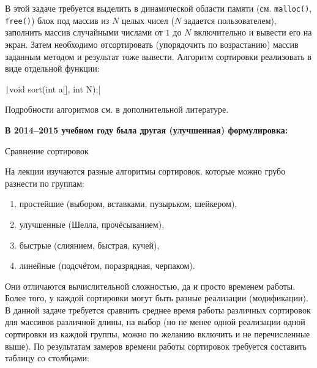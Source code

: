
В этой задаче требуется выделить в динамической области памяти 
(см. \texttt{malloc()}, \texttt{free()}) блок под 
массив из $N$ целых чисел ($N$ задается пользователем), заполнить массив
случайными числами от $1$ до $N$ включительно и вывести его на экран. Затем 
необходимо отсортировать (упорядочить по возрастанию) массив заданным методом 
и результат тоже вывести. Алгоритм сортировки реализовать в виде отдельной функции:

\texttt|void sort(int a[], int N);|

Подробности алгоритмов см. в дополнительной литературе.

\textbf{В 2014--2015 учебном году была другая (улучшенная) формулировка:}

Сравнение сортировок

На лекции изучаются разные алгоритмы сортировок, которые можно грубо разнести по группам:
%
\begin{enumerate}
\item простейшие (выбором, вставками, пузырьком, шейкером),
\item улучшенные (Шелла, прочёсыванием),
\item быстрые (слиянием, быстрая, кучей),
\item линейные (подсчётом, поразрядная, черпаком).
\end{enumerate}
%
Они отличаются вычислительной сложностью, да и просто временем работы. Более
того, у каждой сортировки могут быть разные реализации (модификации). В данной
задаче требуется сравнить среднее время работы различных сортировок для
массивов различной длины, на выбор (но не менее одной реализации одной
сортировки из каждой группы, можно по желанию включить и не перечисленные
выше). По результатам замеров времени работы сортировок требуется составить
таблицу со столбцами:

